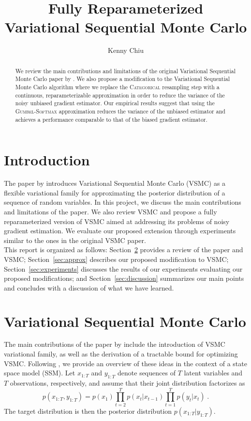 \documentclass[12pt]{article}
\title{\vspace{-1.5cm}\textbf{Fully Reparameterized \\ Variational Sequential Monte Carlo}}
\author{Kenny Chiu}
\date{}
\newcommand{\vsmc}{\textsc{VSMC}\xspace}
\newcommand{\categorical}{\textsc{Categorical}\xspace}
\newcommand{\gumbelsoftmax}{\textsc{Gumbel-Softmax}\xspace}
\newcommand{\ssm}{\textsc{SSM}\xspace}
\begin{document}
\maketitle
\thispagestyle{fancy}

\begin{abstract}
We review the main contributions and limitations of the original Variational Sequential Monte Carlo paper by \textcite{Naesseth:2018}. We also propose a modification to the Variational Sequential Monte Carlo algorithm where we replace the \categorical resampling step with a continuous, reparameterizable approximation in order to reduce the variance of the noisy unbiased gradient estimator. Our empirical results suggest that using the \gumbelsoftmax approximation reduces the variance of the unbiased estimator and achieves a performance comparable to that of the biased gradient estimator.
\end{abstract}

\section{Introduction}

The paper by \textcite{Naesseth:2018} introduces Variational Sequential Monte Carlo (\vsmc) as a flexible variational family for approximating the posterior distribution of a sequence of random variables. In this project, we discuss the main contributions and limitations of the paper. We also review \vsmc and propose a fully reparameterized version of \vsmc aimed at addressing its problems of noisy gradient estimation. We evaluate our proposed extension through experiments similar to the ones in the original \vsmc paper.
\\

This report is organized as follows: Section~\ref{sec:vsmc} provides a review of the paper and \vsmc; Section~\ref{sec:approx} describes our proposed modification to \vsmc; Section~\ref{sec:experiments} discusses the results of our experiments evaluating our proposed modifications; and Section~\ref{sec:discussion} summarizes our main points and concludes with a discussion of what we have learned.


\section{Variational Sequential Monte Carlo}\label{sec:vsmc}

The main contributions of the paper by \textcite{Naesseth:2018} include the introduction of \vsmc variational family, as well as the derivation of a tractable bound for optimizing \vsmc. Following \parencite{Naesseth:2018}, we provide an overview of these ideas in the context of a state space model (\ssm). Let $x_{1:T}$ and $y_{1:T}$ denote sequences of $T$ latent variables and $T$ observations, respectively, and assume that their joint distribution factorizes as
\[
p(x_{1:T},y_{1:T}) = p(x_1)\prod_{t=2}^Tp(x_t|x_{t-1})\prod_{t=1}^Tp(y_t|x_t) \;.
\]
The target distribution is then the posterior distribution $p(x_{1:T}|y_{1:T})$.
\end{document}
